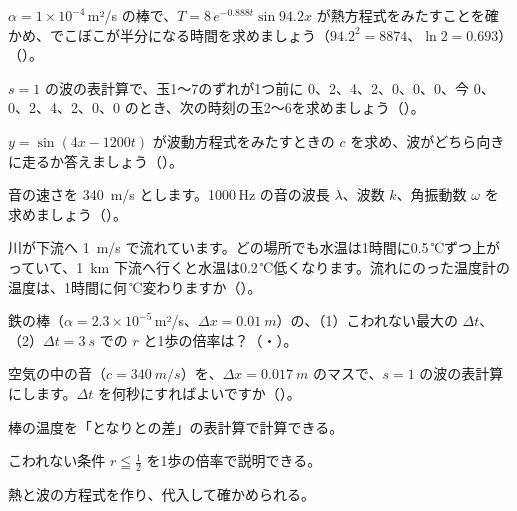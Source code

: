 \bkproblem $\alpha=1\times10^{-4}$\,m²/s の棒で、$T=8\,e^{-0.888t}\sin94.2x$ が熱方程式をみたすことを確かめ、でこぼこが半分になる時間を求めましょう（$94.2^2=8874$、$\ln2=0.693$）\mbox{（）}。

\bkproblem $s=1$ の波の表計算で、玉1〜7のずれが1つ前に 0、2、4、2、0、0、0、今 0、0、2、4、2、0、0 のとき、次の時刻の玉2〜6を求めましょう\mbox{（）}。

\bkproblem $y=\sin(4x-1200t)$ が波動方程式をみたすときの $c$ を求め、波がどちら向きに走るか答えましょう\mbox{（）}。

\bkproblem 音の速さを \qty{340}{m/s} とします。1000\,Hz の音の波長 $\lambda$、波数 $k$、角振動数 $\omega$ を求めましょう\mbox{（）}。


\bkproblem 川が下流へ \qty{1}{m/s} で流れています。どの場所でも水温は1時間に0.5\,℃ずつ上がっていて、\qty{1}{km} 下流へ行くと水温は0.2\,℃低くなります。流れにのった温度計の温度は、1時間に何\,℃変わりますか\mbox{（）}。

\bkproblem 鉄の棒（$\alpha=2.3\times10^{-5}$\,m²/s、$\Delta x=\qty{0.01}{m}$）の、（1）こわれない最大の $\Delta t$、（2）$\Delta t=\qty{3}{s}$ での $r$ と1歩の倍率は？\mbox{（・）}。

\bkproblem 空気の中の音（$c=\qty{340}{m/s}$）を、$\Delta x=\qty{0.017}{m}$ のマスで、$s=1$ の波の表計算にします。$\Delta t$ を何秒にすればよいですか\mbox{（）}。

\begin{furikaeri}
\begin{checklist}
\item 棒の温度を「となりとの差」の表計算で計算できる。
\item こわれない条件 $r\leqq\frac12$ を1歩の倍率で説明できる。
\item 熱と波の方程式を作り、代入して確かめられる。
\end{checklist}
\end{furikaeri}

